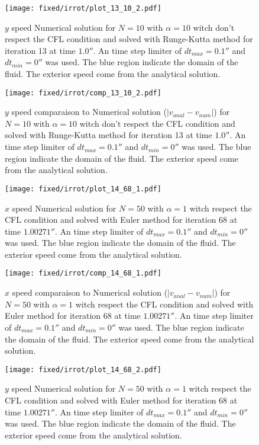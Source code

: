 \begin{figure}
\texttt{[image: fixed/irrot/plot\_13\_10\_2.pdf]}
\caption{$y$ speed Numerical solution for $N=10$ with $\alpha=10$ witch don't respect the CFL condition and solved with Runge-Kutta method
for iteration 13 at time $\unit{1.0}{\second}$.
An time step limiter of $dt_{max}=\unit{0.1}{\second}$ and $dt_{min}=\unit{0}{\second}$ was used.
The blue region indicate the domain of the fluid. The exterior speed come from the analytical solution.
\label{fix:plot_13_10_2}
}
\end{figure}

\begin{figure}
\texttt{[image: fixed/irrot/comp\_13\_10\_2.pdf]}
\caption{$y$ speed comparaison to Numerical solution ($|v_{anal}-v_{num}|$) for $N=10$ with $\alpha=10$ witch don't respect the CFL condition and solved with Runge-Kutta method
for iteration 13 at time $\unit{1.0}{\second}$.
An time step limiter of $dt_{max}=\unit{0.1}{\second}$ and $dt_{min}=\unit{0}{\second}$ was used.
The blue region indicate the domain of the fluid. The exterior speed come from the analytical solution.
\label{fix:comp_13_10_2}
}
\end{figure}

\clearpage
 
 
\begin{figure}
\texttt{[image: fixed/irrot/plot\_14\_68\_1.pdf]}
\caption{$x$ speed Numerical solution for $N=50$ with $\alpha=1$ witch respect the CFL condition and solved with Euler method
for iteration 68 at time $\unit{1.00271}{\second}$.
An time step limiter of $dt_{max}=\unit{0.1}{\second}$ and $dt_{min}=\unit{0}{\second}$ was used.
The blue region indicate the domain of the fluid. The exterior speed come from the analytical solution.
\label{fix:plot_14_68_1}
}
\end{figure}

\begin{figure}
\texttt{[image: fixed/irrot/comp\_14\_68\_1.pdf]}
\caption{$x$ speed comparaison to Numerical solution ($|v_{anal}-v_{num}|$) for $N=50$ with $\alpha=1$ witch respect the CFL condition and solved with Euler method
for iteration 68 at time $\unit{1.00271}{\second}$.
An time step limiter of $dt_{max}=\unit{0.1}{\second}$ and $dt_{min}=\unit{0}{\second}$ was used.
The blue region indicate the domain of the fluid. The exterior speed come from the analytical solution.
\label{fix:comp_14_68_1}
}
\end{figure}

\begin{figure}
\texttt{[image: fixed/irrot/plot\_14\_68\_2.pdf]}
\caption{$y$ speed Numerical solution for $N=50$ with $\alpha=1$ witch respect the CFL condition and solved with Euler method
for iteration 68 at time $\unit{1.00271}{\second}$.
An time step limiter of $dt_{max}=\unit{0.1}{\second}$ and $dt_{min}=\unit{0}{\second}$ was used.
The blue region indicate the domain of the fluid. The exterior speed come from the analytical solution.
\label{fix:plot_14_68_2}
}
\end{figure}


